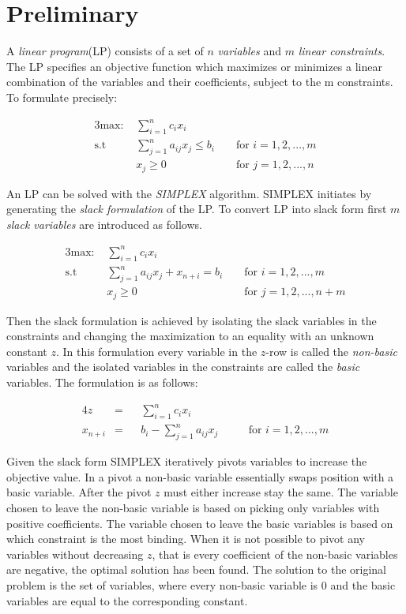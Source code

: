 
\section{Preliminary}
A \textit{linear program}(LP) consists of a set of $n$ \textit{variables} and $m$ \textit{linear constraints}. The LP specifies an objective function which maximizes or minimizes a linear combination of the variables and their coefficients, subject to the m constraints. To formulate precisely:

\begin{alignat}{3}
\text{max: } &\sum_{i=1}^{n} c_i x_i\\
\text{s.t }  & \sum_{j=1}^{n} a_{ij} x_j \leq b_i && \text{ for } i=1,2,...,m\\
             & x_j \geq 0                         && \text{ for } j=1,2,...,n 
\end{alignat}

An LP can be solved with the \textit{SIMPLEX} algorithm. SIMPLEX initiates by generating the \textit{slack formulation} of the LP. To convert LP into slack form first $m$ \textit{slack variables} are introduced as follows.

\begin{alignat}{3}
\text{max: } &\sum_{i=1}^{n} c_i x_i\\
\text{s.t }  & \sum_{j=1}^{n} a_{ij} x_j + x_{n+i} = b_i  && \text{ for } i=1,2,...,m\\
             & x_j \geq 0                                    && \text{ for } j=1,2,...,n+m
\end{alignat}

Then the slack formulation is achieved by isolating the slack variables in the constraints and changing the maximization to an equality with an unknown constant $z$. In this formulation every variable in the $z$-row is called the \textit{non-basic} variables and the isolated variables in the constraints are called the \textit{basic} variables. The formulation is as follows:

\begin{alignat}{4}
z        &= && \sum_{i=1}^{n} c_ix_i\\
x_{n+i}  &= && b_i - \sum_{j=1}^{n} a_{ij} x_j  &&& \text{ for } i=1,2,...,m
\end{alignat}

Given the slack form SIMPLEX iteratively pivots variables to increase the objective value. In a pivot a non-basic variable essentially swaps position with a basic variable. After the pivot $z$ must either increase stay the same. The variable chosen to leave the non-basic variable is based on picking only variables with positive coefficients. The variable chosen to leave the basic variables is based on which constraint is the most binding. When it is not possible to pivot any variables without decreasing $z$, that is every coefficient of the non-basic variables are negative, the optimal solution has been found. The solution to the original problem is the set of variables, where every non-basic variable is $0$ and the basic variables are equal to the corresponding constant.

